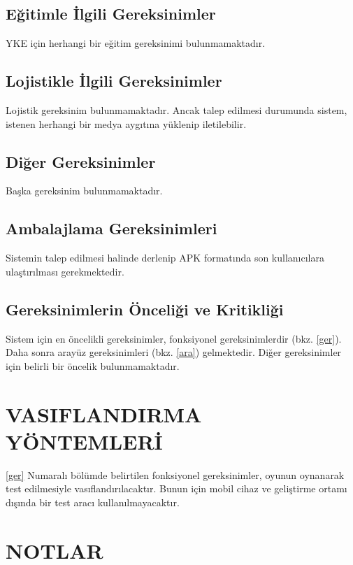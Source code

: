 \documentclass[12pt,a4paper]{article}
\begin{document}
   \subsection{Eğitimle İlgili Gereksinimler}
   YKE için herhangi bir eğitim gereksinimi bulunmamaktadır.

   \subsection{Lojistikle İlgili Gereksinimler}
   Lojistik gereksinim bulunmamaktadır. Ancak talep edilmesi durumunda sistem, istenen herhangi bir medya aygıtına yüklenip iletilebilir.

   \subsection{Diğer Gereksinimler}
   Başka gereksinim bulunmamaktadır.

   \subsection{Ambalajlama Gereksinimleri}
   Sistemin talep edilmesi halinde derlenip APK formatında son kullanıcılara ulaştırılması gerekmektedir.

   \subsection{Gereksinimlerin Önceliği ve Kritikliği}
   Sistem için en öncelikli gereksinimler, fonksiyonel gereksinimlerdir (bkz. \ref{ger}). Daha sonra arayüz gereksinimleri (bkz. \ref{ara}) gelmektedir. Diğer gereksinimler için belirli bir öncelik bulunmamaktadır.

   \section{VASIFLANDIRMA YÖNTEMLERİ}
   \ref{ger} Numaralı bölümde belirtilen fonksiyonel gereksinimler, oyunun oynanarak test edilmesiyle vasıflandırılacaktır. Bunun için mobil cihaz ve geliştirme ortamı dışında bir test aracı kullanılmayacaktır. 

   \section{NOTLAR}
\end{document}
